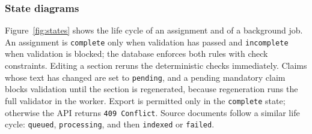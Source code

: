 \documentclass[12pt,a4paper]{article}
\begin{document}
\subsubsection*{State diagrams}

Figure~\ref{fig:states} shows the life cycle of an assignment and of
a background job. An assignment is \texttt{complete} only when
validation has passed and \texttt{incomplete} when validation is
blocked; the database enforces both rules with check constraints.
Editing a section reruns the deterministic checks immediately. Claims
whose text has changed are set to \texttt{pending}, and a pending
mandatory claim blocks validation until the section is regenerated,
because regeneration runs the full validator in the worker. Export
is permitted only in the \texttt{complete} state; otherwise the API
returns \texttt{409 Conflict}. Source documents follow a similar life
cycle: \texttt{queued}, \texttt{processing}, and then
\texttt{indexed} or \texttt{failed}.
\end{document}

